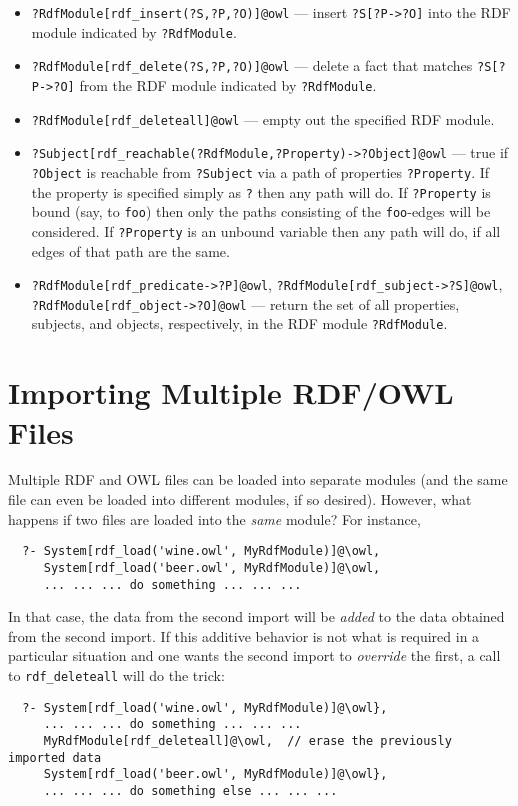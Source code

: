 \begin{itemize}
\item  \texttt{?RdfModule[rdf\_insert(?S,?P,?O)]@\bs{}owl} --- insert
  \texttt{?S[?P->?O]} into the RDF module indicated by \texttt{?RdfModule}.
\item  \texttt{?RdfModule[rdf\_delete(?S,?P,?O)]@\bs{}owl} --- delete
  a fact that matches \texttt{?S[?P->?O]} from the RDF module indicated by
  \texttt{?RdfModule}.
\item  \texttt{?RdfModule[rdf\_deleteall]@\bs{}owl} --- empty out the
  specified RDF module.
\item \texttt{?Subject[rdf\_reachable(?RdfModule,?Property)->?Object]@\bs{}owl}
  --- true if \texttt{?Object}  is reachable from \texttt{?Subject} via a
  path of properties \texttt{?Property}. If the property is specified
  simply as \texttt{?} then any path will do. If \texttt{?Property} is
  bound (say, to \texttt{foo})  then only the paths consisting of the
  \texttt{foo}-edges will be considered. If \texttt{?Property} is an
  unbound variable then any path will do, if all edges of that path are the
  same. 

\item \texttt{?RdfModule[rdf\_predicate->?P]@\bs{}owl},
  \texttt{?RdfModule[rdf\_subject->?S]@\bs{}owl},
  \texttt{?RdfModule[rdf\_object->?O]@\bs{}owl} --- return the set of all
  properties, subjects, and objects, respectively, in the RDF module
  \texttt{?RdfModule}. 
\end{itemize}

\section{Importing Multiple RDF/OWL Files}

Multiple RDF and OWL files can be loaded into separate \ERGO modules (and
the same file can even be loaded into different modules, if so desired).
However, what happens if two files are loaded into the \emph{same} module? For instance,
\begin{verbatim}
  ?- System[rdf_load('wine.owl', MyRdfModule)]@\owl,
     System[rdf_load('beer.owl', MyRdfModule)]@\owl,
     ... ... ... do something ... ... ...
\end{verbatim}
In that case, the data from the second import will be \emph{added} to the data
obtained from the second import. If this additive behavior is not what is
required in a particular situation and one wants the second import to
\emph{override} the first, a call to \texttt{rdf\_deleteall} will
do the trick:
\begin{verbatim}
  ?- System[rdf_load('wine.owl', MyRdfModule)]@\owl},
     ... ... ... do something ... ... ...
     MyRdfModule[rdf_deleteall]@\owl,  // erase the previously imported data
     System[rdf_load('beer.owl', MyRdfModule)]@\owl},
     ... ... ... do something else ... ... ...
\end{verbatim}





